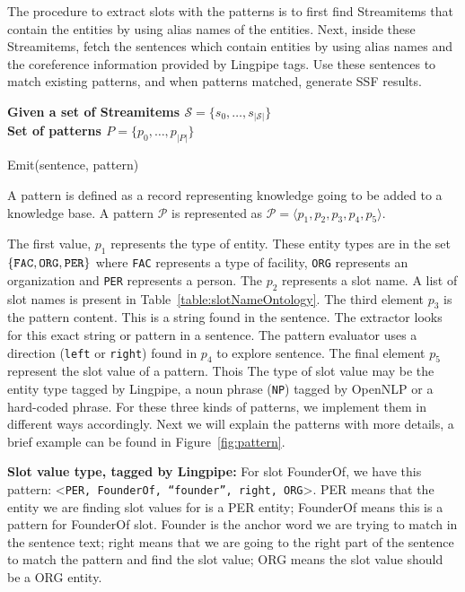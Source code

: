 The procedure to extract slots with the patterns is to 
first find Streamitems that contain the 
entities by using alias names of the entities. Next, inside these Streamitems, 
fetch the sentences which contain entities by using alias names and the 
coreference information provided by Lingpipe tags. Use these sentences to 
match existing patterns, and when patterns matched, generate SSF results.

\begin{algorithm}
  \textbf{Given a set of Streamitems $\mathcal{S} = \{s_0, \ldots, s_{|\mathcal{S}|}\}$}\\
  \textbf{Set of patterns $P = \{p_0, \ldots, p_{|P|}\}$}\\
  \begin{algorithmic}[1]
    \STATE Emit(sentence, pattern)
  \ENDIF
\ENDFOR
\ENDFOR
\end{algorithmic}
\end{algorithm}


A pattern is defined as a record representing knowledge going to be added to a knowledge base.
A pattern $\mathcal{P}$ is represented as $\mathcal{P} = \langle p_1, p_2, p_3, p_4, p_5 \rangle$.

The first value, $p_1$ represents the type of entity. These entity types are in
the set $\{ \text{\tt FAC}, \text{\tt ORG}, \text{\tt PER} \}$ where \texttt{FAC}
represents a type of facility, \texttt{ORG} represents an organization and \texttt{PER}
represents a person.
The $p_2$ represents a slot name.
A list of slot names is present in Table~\ref{table:slotNameOntology}.
The third element $p_3$ is the pattern content. This is a string found in the sentence.
The extractor looks for this exact string or pattern in a sentence.
The pattern evaluator uses a direction (\texttt{left} or \texttt{right}) found in
$p_4$ to explore sentence.
The final element $p_5$ represent the slot value of a pattern. Thois
The type of slot value may be the entity 
type tagged by Lingpipe, a noun phrase (\texttt{NP}) tagged by OpenNLP or a hard-coded phrase. 
For these three kinds of patterns, we implement them in different 
ways accordingly. Next we will explain the patterns with more details, a brief
example can be found in Figure~\ref{fig:pattern}. 

\textbf{Slot value type, tagged by Lingpipe:} For slot FounderOf, we have this
pattern: \textless \texttt{PER, FounderOf, ``founder'', right, ORG}\textgreater. PER means 
that the entity we are finding slot values for is a PER entity; FounderOf 
means this is a pattern for FounderOf slot. Founder is the anchor word we are 
trying to match in the sentence text; right means that we are going to the 
right part of the sentence to match the pattern and find the slot value; ORG 
means the slot value should be a ORG entity.

